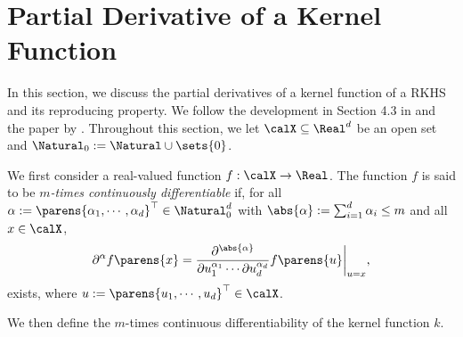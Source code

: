 \documentclass[12pt]{article}
\theoremstyle{definition}
\theoremstyle{theorem}
\newtheorem{lemma}{Lemma}
\theoremstyle{remark}
\begin{document}
\section{Partial Derivative of a Kernel Function}\label{section-kernel-derivative}

In this section, we discuss the partial derivatives of a kernel function of a RKHS and its reproducing property. We follow the development in Section 4.3 in \textcite{Steinwart2008-tn} and the paper by \textcite{Zhou2008-jt}. Throughout this section, we let $\calX \subseteq \Real^d$ be an open set and $\Natural_0 := \Natural \cup \sets{0}$. 

We first consider a real-valued function $f: \calX \to \Real$. The function $f$ is said to be \textit{$m$-times continuously differentiable} if, for all $\alpha := \parens{\alpha_1, \cdots, \alpha_d}^\top \in \Natural_0^d$ with $\abs{\alpha} := \sum_{i=1}^d \alpha_i \le m$ and all $x \in \calX$, 
\begin{align*}
	\partial^\alpha f \parens{x} 
	= \frac{\partial^{\abs{\alpha}}}{\partial u_1^{\alpha_1} \cdots \partial u_d^{\alpha_d}} f \parens{u} \bigg\vert_{u=x}, 
\end{align*}
exists, where $u := \parens{u_1, \cdots, u_d}^\top \in \calX$. 


We then define the $m$-times continuous differentiability of the kernel function $k$. 
\end{document}
